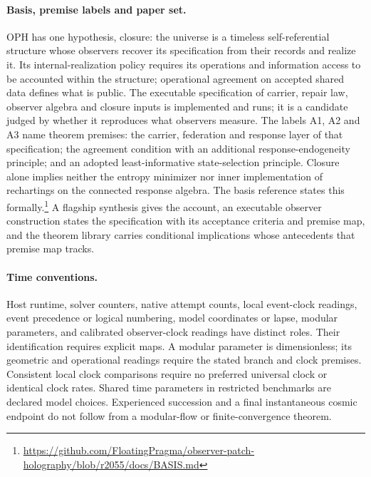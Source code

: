\paragraph{Basis, premise labels and paper set.}
OPH has one hypothesis, closure: the universe is a timeless self-referential
structure whose observers recover its specification from their records and
realize it. Its internal-realization policy requires its operations and
information access to be accounted within the structure; operational
agreement on accepted shared data defines what is public. The
executable specification of carrier, repair law, observer algebra and
closure inputs is implemented and runs; it is a candidate judged by whether
it reproduces what observers measure. The labels A1, A2 and A3 name theorem premises: the carrier,
federation and response layer of that specification; the agreement condition
with an additional response-endogeneity principle; and an adopted
least-informative state-selection principle. Closure alone implies neither
the entropy minimizer nor inner implementation of rechartings on the
connected response algebra. The
basis reference states this formally.\footnote{\url{https://github.com/FloatingPragma/observer-patch-holography/blob/r2055/docs/BASIS.md}}
A flagship synthesis gives the account, an executable observer construction
states the specification with its acceptance criteria and premise map, and
the theorem library carries conditional implications whose antecedents that
premise map tracks.
\fi

\paragraph{Time conventions.}
Host runtime, solver counters, native attempt counts, local event-clock
readings, event precedence or logical numbering, model coordinates or lapse,
modular parameters, and calibrated observer-clock readings have distinct
roles. Their identification requires explicit maps.
A modular parameter is dimensionless; its geometric and operational readings
require the stated branch and clock premises. Consistent local clock
comparisons require no preferred universal clock or identical clock rates.
Shared time parameters in restricted benchmarks are declared model choices.
Experienced succession and a final instantaneous cosmic endpoint do not follow
from a modular-flow or finite-convergence theorem.
